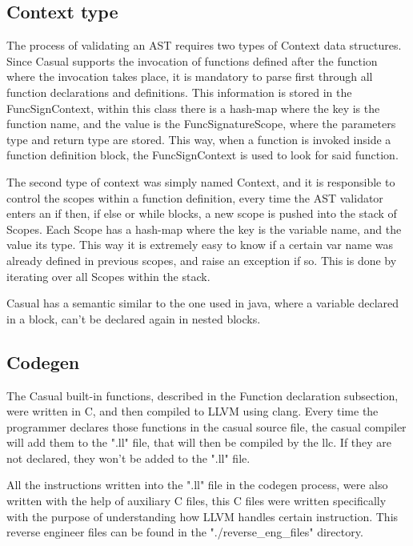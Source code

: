 \documentclass[12pt]{article}
\begin{document}
\newpage

\subsection{Context type}
The process of validating an AST requires two types of Context data structures. Since Casual supports the invocation of functions defined after the function where the invocation takes place, it is mandatory to parse first through all function declarations and definitions. This information is stored in the FuncSignContext, within this class there is a hash-map where the key is the function name, and the value is the FuncSignatureScope, where the parameters type and return type are stored. This way, when a function is invoked inside a function definition block, the FuncSignContext is used to look for said function.

The second type of context was simply named Context, and it is responsible to control the scopes within a function definition, every time the AST validator enters an if then, if else or while blocks, a new scope is pushed into the stack of Scopes. Each Scope has a hash-map where the key is the variable name, and the value its type. This way it is extremely easy to know if a certain var name was already defined in previous scopes, and raise an exception if so. This is done by iterating over all Scopes within the stack.

Casual has a semantic similar to the one used in java, where a variable declared in a block, can't be declared again in nested blocks.

\subsection{Codegen}
The Casual built-in functions, described in the Function declaration subsection, were written in C, and then compiled to LLVM using clang. Every time the programmer declares those functions in the casual source file, the casual compiler will add them to the ".ll" file, that will then be compiled by the llc. If they are not declared, they won't be added to the ".ll" file.

All the instructions written into the ".ll" file in the codegen process, were also written with the help of auxiliary C files, this C files were written specifically with the purpose of understanding how LLVM handles certain instruction. This reverse engineer files can be found in the "./reverse\_eng\_files" directory.\\
\end{document}
